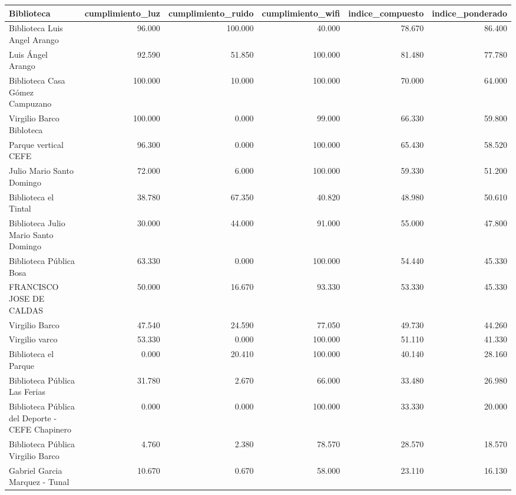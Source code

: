 \begin{tabular}{lrrrrr}
\toprule
Biblioteca & cumplimiento\_luz & cumplimiento\_ruido & cumplimiento\_wifi & indice\_compuesto & indice\_ponderado \\
\midrule
Biblioteca Luis Angel Arango & 96.000 & 100.000 & 40.000 & 78.670 & 86.400 \\
Luis Ángel Arango & 92.590 & 51.850 & 100.000 & 81.480 & 77.780 \\
Biblioteca Casa Gómez Campuzano & 100.000 & 10.000 & 100.000 & 70.000 & 64.000 \\
Virgilio Barco Bibloteca & 100.000 & 0.000 & 99.000 & 66.330 & 59.800 \\
Parque vertical CEFE & 96.300 & 0.000 & 100.000 & 65.430 & 58.520 \\
Julio Mario Santo Domingo & 72.000 & 6.000 & 100.000 & 59.330 & 51.200 \\
Biblioteca el Tintal & 38.780 & 67.350 & 40.820 & 48.980 & 50.610 \\
Biblioteca Julio Mario Santo Domingo & 30.000 & 44.000 & 91.000 & 55.000 & 47.800 \\
Biblioteca Pública Bosa & 63.330 & 0.000 & 100.000 & 54.440 & 45.330 \\
FRANCISCO JOSE DE CALDAS & 50.000 & 16.670 & 93.330 & 53.330 & 45.330 \\
Virgilio Barco & 47.540 & 24.590 & 77.050 & 49.730 & 44.260 \\
Virgilio varco & 53.330 & 0.000 & 100.000 & 51.110 & 41.330 \\
Biblioteca el Parque & 0.000 & 20.410 & 100.000 & 40.140 & 28.160 \\
Biblioteca Pública Las Ferias & 31.780 & 2.670 & 66.000 & 33.480 & 26.980 \\
Biblioteca Pública del Deporte - CEFE Chapinero & 0.000 & 0.000 & 100.000 & 33.330 & 20.000 \\
Biblioteca Pública Virgilio Barco & 4.760 & 2.380 & 78.570 & 28.570 & 18.570 \\
Gabriel Garcia Marquez - Tunal & 10.670 & 0.670 & 58.000 & 23.110 & 16.130 \\
\bottomrule
\end{tabular}

